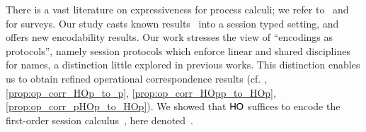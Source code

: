 \documentclass[preprint,11pt]{elsarticle}
\begin{document}
{%
%
There is a vast literature on expressiveness for process calculi; we refer to~\cite{DBLP:journals/entcs/Parrow08} 
and \cite[\S\,2.3]{PerezPhD10} for surveys.
Our study casts known results~\cite{SangiorgiD:expmpa} into a session typed setting, and
offers new encodability results.
Our work stresses the 
view of ``encodings as protocols'', namely session protocols which
enforce linear and shared disciplines for names, a distinction
little explored in %
previous works.
This distinction %
enables us to obtain 
 refined 
operational correspondence results (cf. , \ref{prop:op_corr_HOp_to_p}, \ref{prop:op_corr_HOpp_to_HOp}, \ref{prop:op_corr_pHOp_to_HOp}).
We showed that
$\mathsf{HO}$ suffices to encode   the first-order session
calculus~\cite{honda.vasconcelos.kubo:language-primitives}, here denoted~\sessp. %
}
\end{document}
